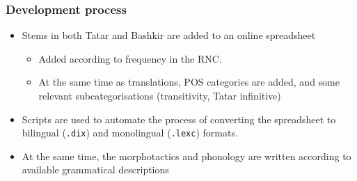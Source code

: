\documentclass[10pt,xetex]{beamer} %
\begin{document}
\begin{frame}
  \frametitle{Development process}

  \begin{itemize} %
    \item Stems in both Tatar and Bashkir are added to an online spreadsheet
    \begin{itemize}
      \item Added according to frequency in the RNC. %

      \item At the same time as translations, POS categories are added, and some
        relevant subcategorisations (transitivity, Tatar infinitive)
    \end{itemize}
    \item Scripts are used to automate the process of converting the spreadsheet
       to bilingual ({\small {\tt .dix}}) and monolingual ({\small {\tt .lexc}}) formats.
    \item At the same time, the morphotactics and phonology are written
       according to available grammatical descriptions
    
  \end{itemize}
\end{frame}
\end{document}
